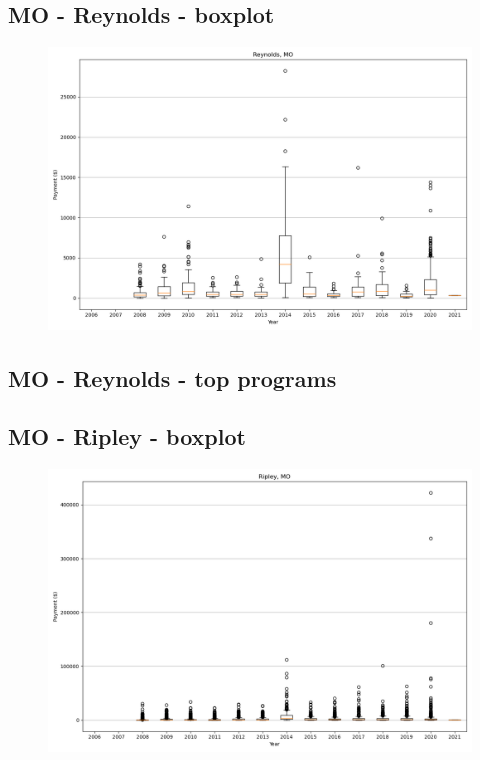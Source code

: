 \subsection*{MO - Reynolds - boxplot}
\begin{figure}[h]
\centering
\includegraphics[width=7in]{../output/boxplots/counties/Reynolds-MO_boxplot.png}
\end{figure}


\subsection*{MO - Reynolds - top programs}

\newpage
\subsection*{MO - Ripley - boxplot}
\begin{figure}[h]
\centering
\includegraphics[width=7in]{../output/boxplots/counties/Ripley-MO_boxplot.png}
\end{figure}


